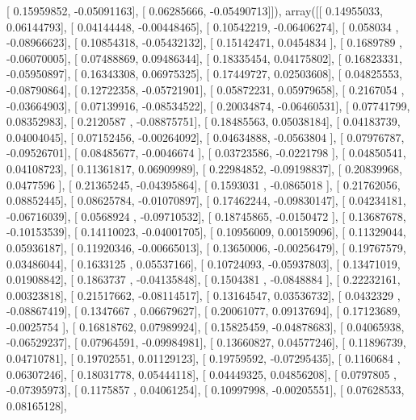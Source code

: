 \documentclass{article}
\begin{document}
       [ 0.15959852, -0.05091163],
       [ 0.06285666, -0.05490713]]), array([[ 0.14955033,  0.06144793],
       [ 0.04144448, -0.00448465],
       [ 0.10542219, -0.06406274],
       [ 0.058034  , -0.08966623],
       [ 0.10854318, -0.05432132],
       [ 0.15142471,  0.0454834 ],
       [ 0.1689789 , -0.06070005],
       [ 0.07488869,  0.09486344],
       [ 0.18335454,  0.04175802],
       [ 0.16823331, -0.05950897],
       [ 0.16343308,  0.06975325],
       [ 0.17449727,  0.02503608],
       [ 0.04825553, -0.08790864],
       [ 0.12722358, -0.05721901],
       [ 0.05872231,  0.05979658],
       [ 0.2167054 , -0.03664903],
       [ 0.07139916, -0.08534522],
       [ 0.20034874, -0.06460531],
       [ 0.07741799,  0.08352983],
       [ 0.2120587 , -0.08875751],
       [ 0.18485563,  0.05038184],
       [ 0.04183739,  0.04004045],
       [ 0.07152456, -0.00264092],
       [ 0.04634888, -0.0563804 ],
       [ 0.07976787, -0.09526701],
       [ 0.08485677, -0.0046674 ],
       [ 0.03723586, -0.0221798 ],
       [ 0.04850541,  0.04108723],
       [ 0.11361817,  0.06909989],
       [ 0.22984852, -0.09198837],
       [ 0.20839968,  0.0477596 ],
       [ 0.21365245, -0.04395864],
       [ 0.1593031 , -0.0865018 ],
       [ 0.21762056,  0.08852445],
       [ 0.08625784, -0.01070897],
       [ 0.17462244, -0.09830147],
       [ 0.04234181, -0.06716039],
       [ 0.0568924 , -0.09710532],
       [ 0.18745865, -0.0150472 ],
       [ 0.13687678, -0.10153539],
       [ 0.14110023, -0.04001705],
       [ 0.10956009,  0.00159096],
       [ 0.11329044,  0.05936187],
       [ 0.11920346, -0.00665013],
       [ 0.13650006, -0.00256479],
       [ 0.19767579,  0.03486044],
       [ 0.1633125 ,  0.05537166],
       [ 0.10724093, -0.05937803],
       [ 0.13471019,  0.01908842],
       [ 0.1863737 , -0.04135848],
       [ 0.1504381 , -0.0848884 ],
       [ 0.22232161,  0.00323818],
       [ 0.21517662, -0.08114517],
       [ 0.13164547,  0.03536732],
       [ 0.0432329 , -0.08867419],
       [ 0.1347667 ,  0.06679627],
       [ 0.20061077,  0.09137694],
       [ 0.17123689, -0.0025754 ],
       [ 0.16818762,  0.07989924],
       [ 0.15825459, -0.04878683],
       [ 0.04065938, -0.06529237],
       [ 0.07964591, -0.09984981],
       [ 0.13660827,  0.04577246],
       [ 0.11896739,  0.04710781],
       [ 0.19702551,  0.01129123],
       [ 0.19759592, -0.07295435],
       [ 0.1160684 ,  0.06307246],
       [ 0.18031778,  0.05444118],
       [ 0.04449325,  0.04856208],
       [ 0.0797805 , -0.07395973],
       [ 0.1175857 ,  0.04061254],
       [ 0.10997998, -0.00205551],
       [ 0.07628533,  0.08165128],
\end{document}
